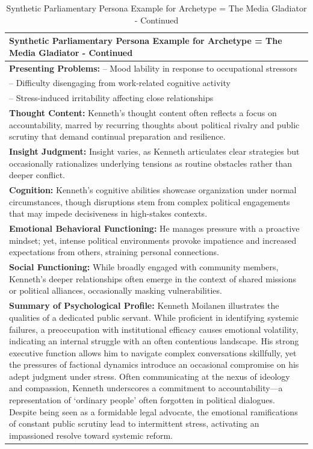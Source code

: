 \documentclass[11pt]{article}
\begin{document}
\begin{table}[ht]
\centering
\caption{Synthetic Parliamentary Persona Example for Archetype = The Media Gladiator - Continued}
\label{tab:parliamentry-persona-example-4}
\scriptsize %
\begin{tabularx}{\textwidth}{X}
\toprule
\textbf{Synthetic Parliamentary Persona Example for Archetype = The Media Gladiator - Continued} \\
\midrule
\textbf{Presenting Problems:}
– Mood lability in response to occupational stressors \\
– Difficulty disengaging from work-related cognitive activity \\
– Stress-induced irritability affecting close relationships \\[4pt]

\textbf{Thought Content:} Kenneth's thought content often reflects a focus on accountability, marred by recurring thoughts about political rivalry and public scrutiny that demand continual preparation and resilience. \\[4pt]

\textbf{Insight Judgment:} Insight varies, as Kenneth articulates clear strategies but occasionally rationalizes underlying tensions as routine obstacles rather than deeper conflict. \\[4pt]

\textbf{Cognition:} Kenneth's cognitive abilities showcase organization under normal circumstances, though disruptions stem from complex political engagements that may impede decisiveness in high-stakes contexts. \\[4pt]

\textbf{Emotional Behavioral Functioning:} He manages pressure with a proactive mindset; yet, intense political environments provoke impatience and increased expectations from others, straining personal connections. \\[4pt]

\textbf{Social Functioning:} While broadly engaged with community members, Kenneth's deeper relationships often emerge in the context of shared missions or political alliances, occasionally masking vulnerabilities. \\[4pt]

\textbf{Summary of Psychological Profile:} Kenneth Moilanen illustrates the qualities of a dedicated public servant. While proficient in identifying systemic failures, a preoccupation with institutional efficacy causes emotional volatility, indicating an internal struggle with an often contentious landscape. His strong executive function allows him to navigate complex conversations skillfully, yet the pressures of factional dynamics introduce an occasional compromise on his adept judgment under stress. Often communicating at the nexus of ideology and compassion, Kenneth underscores a commitment to accountability—a representation of ‘ordinary people’ often forgotten in political dialogues. Despite being seen as a formidable legal advocate, the emotional ramifications of constant public scrutiny lead to intermittent stress, activating an impassioned resolve toward systemic reform. \\[4pt]


\end{tabularx}
\end{table}
\end{document}
